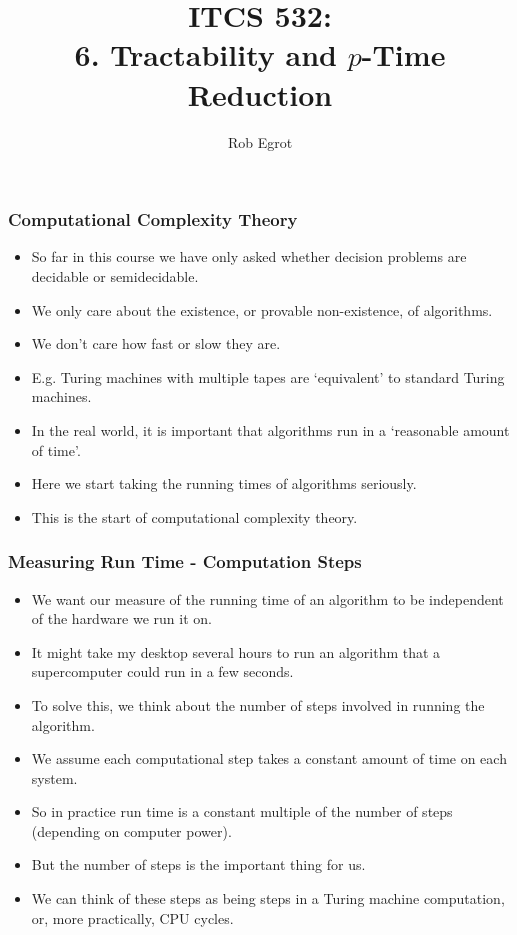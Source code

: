 \documentclass[handout]{beamer}
\title{ITCS 532:\\ 
6. Tractability and $p$-Time Reduction}
\date{}
\author{Rob Egrot}
\begin{document}
\begin{frame}
\titlepage
\end{frame}

\begin{frame}
\frametitle{Computational Complexity Theory}
\begin{itemize}
\item So far in this course we have only asked whether decision problems are decidable or semidecidable.
\vspace{0.2cm}
\item We only care about the existence, or provable non-existence, of algorithms.
\vspace{0.2cm}
\item We don't care how fast or slow they are.
\vspace{0.2cm}
\item E.g. Turing machines with multiple tapes are `equivalent' to standard Turing machines.
\vspace{0.2cm}
\item In the real world, it is important that algorithms run in a `reasonable amount of time'.
\vspace{0.2cm}
\item Here we start taking the running times of algorithms seriously.
\vspace{0.2cm}
\item This is the start of computational complexity theory. 
\end{itemize}
\end{frame}

\begin{frame}
\frametitle{Measuring Run Time - Computation Steps}
\begin{itemize}
\item We want our measure of the running time of an algorithm to be independent of the hardware we run it on. 
\vspace{0.2cm}
\item It might take my desktop several hours to run an algorithm that a supercomputer could run in a few seconds.
\vspace{0.2cm}
\item To solve this, we think about the number of steps involved in running the algorithm.
\vspace{0.2cm} 
\item We assume each computational step takes a constant amount of time on each system.
\vspace{0.2cm}
\item So in practice run time is a constant multiple of the number of steps (depending on computer power).
\vspace{0.2cm}
\item But the number of steps is the important thing for us. 
\vspace{0.2cm}
\item We can think of these steps as being steps in a Turing machine computation, or, more practically, CPU cycles.
\end{itemize}
\end{frame}
\end{document}
